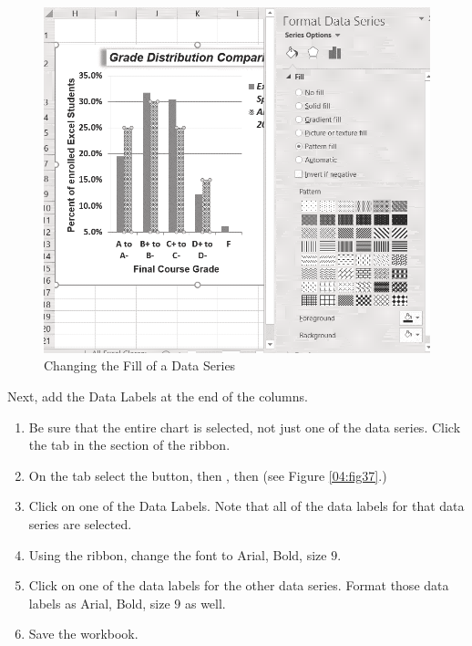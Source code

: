\begin{figure}[H]
	\centering
	\includegraphics[width=\maxwidth{.95\linewidth}]{gfx/ch04_fig36}
	\caption{Changing the Fill of a Data Series}
	\label{04:fig36}
\end{figure}

Next, add the Data Labels at the end of the columns.

\begin{enumerate}
	\item Be sure that the entire chart is selected, not just one of the data series. Click the  tab in the  section of the ribbon.
	\item On the  tab select the  button, then , then  (see Figure \ref{04:fig37}.)
	\item Click on one of the Data Labels. Note that all of the data labels for that data series are selected.
	\item Using the  ribbon, change the font to Arial, Bold, size $ 9 $.
	\item Click on one of the data labels for the other data series. Format those data labels as Arial, Bold, size $ 9 $ as well.
	\item Save the workbook.
\end{enumerate}

